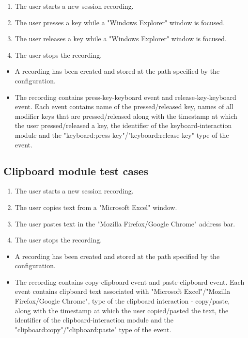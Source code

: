 \begin{tests}
	{\begin{enumerate}
		\item The user starts a new session recording.
		\item The user presses a key while a "Windows Explorer" window is focused.
		\item The user releases a key while a "Windows Explorer" window is focused.
		\item The user stops the recording.
	\end{enumerate}}
	{\begin{itemize}
		\item A recording has been created and stored at the path specified by the configuration.
		\item The recording contains press-key-keyboard event and release-key-keyboard event. Each event contains name of the pressed/released key, names of all modifier keys that are pressed/released along with the timestamp at which the user pressed/released a key, the identifier of the keyboard-interaction module and the "keyboard:press-key"/"keyboard:release-key" type of the event.
	\end{itemize}}
\end{tests}

\subsection{Clipboard module test cases}

\begin{tests}
	{\begin{enumerate}
		\item The user starts a new session recording.
		\item The user copies text from a "Microsoft Excel" window.
		\item The user pastes text in the "Mozilla Firefox/Google Chrome" address bar.
		\item The user stops the recording.
	\end{enumerate}}
	{\begin{itemize}
		\item A recording has been created and stored at the path specified by the configuration.
		\item The recording contains copy-clipboard event and paste-clipboard event. Each event contains clipboard text associated with "Microsoft Excel"/"Mozilla Firefox/Google Chrome", type of the clipboard interaction - copy/paste, along with the timestamp at which the user copied/pasted the text, the identifier of the clipboard-interaction module and the "clipboard:copy"/"clipboard:paste" type of the event.
	\end{itemize}}
\end{tests}